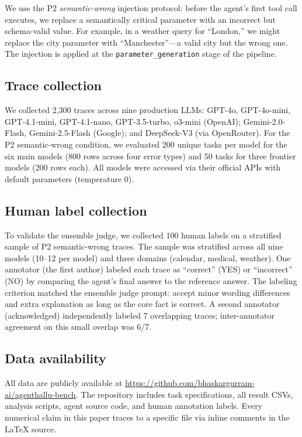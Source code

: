\documentclass[11pt]{article}
\begin{document}
We use the P2 \emph{semantic-wrong} injection protocol: before the
agent's first tool call executes, we replace a semantically critical
parameter with an incorrect but schema-valid value.
For example, in a weather query for ``London,'' we might replace the
city parameter with ``Manchester''---a valid city but the wrong one.
The injection is applied at the \texttt{parameter\_generation} stage
of the pipeline.

\subsection{Trace collection}

We collected 2{,}300 traces across nine production LLMs:
GPT-4o, GPT-4o-mini, GPT-4.1-mini, GPT-4.1-nano, GPT-3.5-turbo,
o3-mini (OpenAI); Gemini-2.0-Flash, Gemini-2.5-Flash (Google); and
DeepSeek-V3 (via OpenRouter).
For the P2 semantic-wrong condition, we evaluated 200 unique tasks
per model for the six main models (800 rows across four error types)
and 50 tasks for three frontier models (200 rows each).
All models were accessed via their official APIs with default
parameters (temperature 0).

\subsection{Human label collection}

To validate the ensemble judge, we collected 100 human labels on a
stratified sample of P2 semantic-wrong traces.
The sample was stratified across all nine models (10--12 per model)
and three domains (calendar, medical, weather).
One annotator (the first author) labeled each trace as ``correct''
(YES) or ``incorrect'' (NO) by comparing the agent's final answer to
the reference answer.
The labeling criterion matched the ensemble judge prompt: accept minor
wording differences and extra explanation as long as the core fact is
correct.
A second annotator (acknowledged) independently labeled 7 overlapping
traces; inter-annotator agreement on this small overlap was 6/7.

\subsection{Data availability}

All data are publicly available at
\url{https://github.com/bhaskargurram-ai/agenthallu-bench}.
The repository includes task specifications, all result CSVs, analysis
scripts, agent source code, and human annotation labels.
Every numerical claim in this paper traces to a specific file via
inline comments in the \LaTeX{} source.
\end{document}
